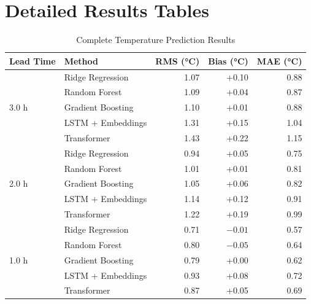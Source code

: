 \documentclass[11pt,letterpaper]{article}
\begin{document}
\section{Detailed Results Tables}

\begin{table}[H]
\centering
\caption{Complete Temperature Prediction Results}
\label{tab:full_temp}
\small
\begin{tabular}{l|l|rrr}
\toprule
\textbf{Lead Time} & \textbf{Method} & \textbf{RMS (°C)} & \textbf{Bias (°C)} & \textbf{MAE (°C)} \\
\midrule
\multirow{5}{*}{3.0 h}
& Ridge Regression & 1.07 & +0.10 & 0.88 \\
& Random Forest & 1.09 & +0.04 & 0.87 \\
& Gradient Boosting & 1.10 & +0.01 & 0.88 \\
& LSTM + Embeddings & 1.31 & +0.15 & 1.04 \\
& Transformer & 1.43 & +0.22 & 1.15 \\
\midrule
\multirow{5}{*}{2.0 h}
& Ridge Regression & 0.94 & +0.05 & 0.75 \\
& Random Forest & 1.01 & +0.01 & 0.81 \\
& Gradient Boosting & 1.05 & +0.06 & 0.82 \\
& LSTM + Embeddings & 1.14 & +0.12 & 0.91 \\
& Transformer & 1.22 & +0.19 & 0.99 \\
\midrule
\multirow{5}{*}{1.0 h}
& Ridge Regression & 0.71 & $-0.01$ & 0.57 \\
& Random Forest & 0.80 & $-0.05$ & 0.64 \\
& Gradient Boosting & 0.79 & +0.00 & 0.62 \\
& LSTM + Embeddings & 0.93 & +0.08 & 0.72 \\
& Transformer & 0.87 & +0.05 & 0.69 \\
\bottomrule
\end{tabular}
\end{table}
\end{document}
